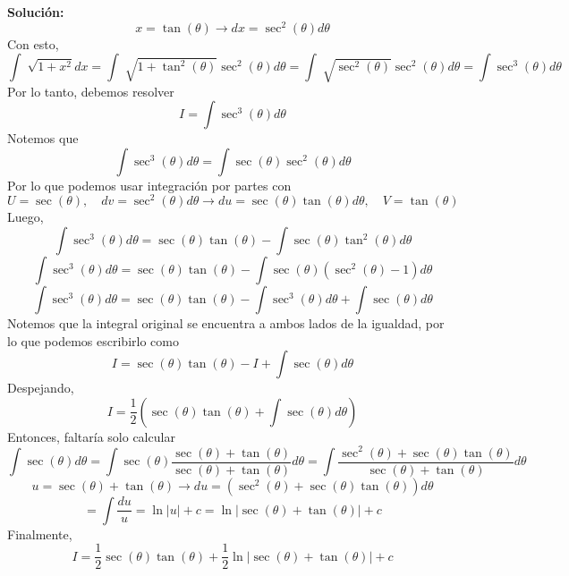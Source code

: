 \documentclass[12pt]{article}
\newenvironment{solucion}
{\begin{mdframed}[backgroundcolor=black!10]
		{\bf Solución:}\\
	}
	{
	\end{mdframed}
}
\newenvironment{preguntas}
{\begin{enumerate}\itemsep12pt
	}
	{
	\end{enumerate}
}
\newcommand{\ra}{\rightarrow}
\begin{document}
\begin{preguntas}
\begin{solucion}
$$x = \tan(\theta) \ra dx = \sec^2(\theta)d\theta$$
Con esto,
$$\displaystyle\int \sqrt[]{1+x^2}dx =
\displaystyle\int \sqrt[]{1+\tan^2(\theta)}\sec^2(\theta)d\theta =
\displaystyle\int \sqrt[]{\sec^2(\theta)}\sec^2(\theta)d\theta =
\displaystyle\int \sec^3(\theta)d\theta
$$
Por lo tanto, debemos resolver
$$I = \displaystyle\int \sec^3(\theta)d\theta$$
Notemos que
$$\displaystyle\int \sec^3(\theta)d\theta =
\displaystyle\int \sec(\theta)\sec^2(\theta)d\theta
$$
Por lo que podemos usar integración por partes con
$$U = \sec(\theta), \quad dv = \sec^2(\theta)d\theta \ra 
du = \sec(\theta)\tan(\theta)d\theta, \quad V = \tan(\theta)$$
Luego,
$$\displaystyle\int \sec^3(\theta)d\theta = 
\sec(\theta)\tan(\theta) - \displaystyle\int \sec(\theta)\tan^2(\theta)d\theta
$$
$$\displaystyle\int \sec^3(\theta)d\theta = 
\sec(\theta)\tan(\theta) - \displaystyle\int \sec(\theta)(\sec^2(\theta)-1)d\theta
$$
$$\displaystyle\int \sec^3(\theta)d\theta = 
\sec(\theta)\tan(\theta) - \displaystyle\int \sec^3(\theta)d\theta + \displaystyle\int \sec(\theta)d\theta
$$
Notemos que la integral original se encuentra a ambos lados de la igualdad, por lo que podemos escribirlo como
$$I = 
\sec(\theta)\tan(\theta) - I + \displaystyle\int \sec(\theta)d\theta
$$
Despejando,
$$I = 
\dfrac{1}{2}\left(\sec(\theta)\tan(\theta) + \displaystyle\int \sec(\theta)d\theta\right)
$$
Entonces, faltaría solo calcular
$$\displaystyle\int \sec(\theta)d\theta =
\displaystyle\int \sec(\theta)\dfrac{\sec(\theta) + \tan(\theta)}{\sec(\theta) + \tan(\theta)}d\theta =
\displaystyle\int \dfrac{\sec^2(\theta) + \sec(\theta)\tan(\theta)}{\sec(\theta) + \tan(\theta)}d\theta
$$
$$u = \sec(\theta) + \tan(\theta) \ra du = (\sec^2(\theta) + \sec(\theta)\tan(\theta))d\theta$$
$$= \displaystyle\int \dfrac{du}{u} = \ln|u| + c = \ln|\sec(\theta) + \tan(\theta)| + c
$$
Finalmente,
$$I = 
\dfrac{1}{2}\sec(\theta)\tan(\theta) + \dfrac{1}{2}\ln|\sec(\theta) + \tan(\theta)| + c
$$
\end{solucion}
\end{preguntas}
\end{document}
